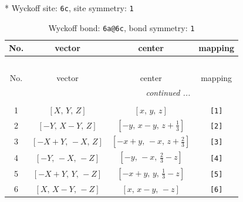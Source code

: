 \documentclass[fleqn,8pt]{jsarticle}
\begin{document}
* Wyckoff site: {\tt 6c}, site symmetry: {\tt 1}
\renewcommand{\arraystretch}{1.2}
\begin{longtable}{cccc}
\caption{Wyckoff bond: {\tt 6a@6c}, bond symmetry: {\tt 1}}
 \\
 \hline \hline
No. & vector & center & mapping \\ \hline \endfirsthead

\multicolumn{3}{l}{\tablename\ \thetable{}} \\
 \hline \hline
No. & vector & center & mapping \\ \hline \endhead

 \hline \hline
\multicolumn{3}{r}{\footnotesize\it continued ...} \\ \endfoot

 \hline \hline
\multicolumn{3}{r}{} \\ \endlastfoot

1 & $\left[ X,\, Y,\, Z \right]$ & $\left[ x,\, y,\, z \right]$ & {\tt [1]} \\ \hline
2 & $\left[ - Y,\, X - Y,\, Z \right]$ & $\left[ - y,\, x - y,\, z + \frac{1}{3} \right]$ & {\tt [2]} \\ \hline
3 & $\left[ - X + Y,\, - X,\, Z \right]$ & $\left[ - x + y,\, - x,\, z + \frac{2}{3} \right]$ & {\tt [3]} \\ \hline
4 & $\left[ - Y,\, - X,\, - Z \right]$ & $\left[ - y,\, - x,\, \frac{2}{3} - z \right]$ & {\tt [4]} \\ \hline
5 & $\left[ - X + Y,\, Y,\, - Z \right]$ & $\left[ - x + y,\, y,\, \frac{1}{3} - z \right]$ & {\tt [5]} \\ \hline
6 & $\left[ X,\, X - Y,\, - Z \right]$ & $\left[ x,\, x - y,\, - z \right]$ & {\tt [6]} \\
\end{longtable}
\end{document}
